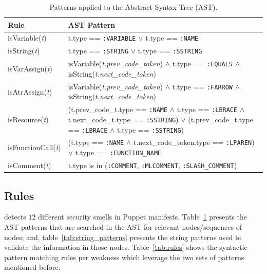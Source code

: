 \begin{table}
      \begin{subtable}[h]{\linewidth}
      \centering
      \begin{tabular}{p{2cm}p{6cm}} 
        \toprule
        \textbf{Rule} & \textbf{AST Pattern}  \\
        \midrule		
        isVariable(\textit{t}) & 
          t.type == \texttt{:VARIABLE} $\vee$ t.type == \texttt{:NAME} \\\midrule
        isString(\textit{t}) & 
          t.type == \texttt{:STRING} $\vee$ t.type == \texttt{:SSTRING} \\\midrule
        isVarAssign(\textit{t}) & 
          isVariable(\textit{t.prev\_code\_token}) $\wedge$ 
          t.type == \texttt{:EQUALS} $\wedge$ 
          isString(\textit{t.next\_code\_token}) \\\midrule
        isAtrAssign(\textit{t}) & 
          isVariable(\textit{t.prev\_code\_token}) $\wedge$ 
          t.type == \texttt{:FARROW} $\wedge$ 
          isString(\textit{t.next\_code\_token}) \\\midrule
        isResource(\textit{t}) &
          (t.prev\_code\_t.type == \texttt{:NAME} $\wedge$ 
          t.type == \texttt{:LBRACE} $\wedge$ 
          t.next\_code\_t.type == \texttt{:SSTRING}) $\vee$
          (t.prev\_code\_t.type == \texttt{:LBRACE} $\wedge$ 
          t.type == \texttt{:SSTRING})\\\midrule
        isFunctionCall(\textit{t}) &
          (t.type == \texttt{:NAME} $\wedge$ 
          t.next\_code\_token.type == \texttt{:LPAREN}) $\vee$
          t.type == \texttt{:FUNCTION\_NAME} \\\midrule
        isComment(\textit{t}) & 
          t.type is in (\texttt{:COMMENT}, \texttt{:MLCOMMENT}, \texttt{:SLASH\_COMMENT})\\
      \bottomrule
      \end{tabular}
      \caption{Patterns applied to the Abstract Syntax Tree (AST).}
      \label{tab:ast_patterns}
      \end{subtable}
      \vspace{-4ex}
\end{table}
%
%
\subsection{Rules}\label{sec:rules}
%
\toolname{} detects $12$ different security smells in Puppet manifests.
Table~\ref{tab:ast_patterns} presents the AST patterns 
that are searched in the AST for relevant nodes/sequences of nodes; 
and, table~\ref{tab:string_patterns} presents the string patterns used 
to validate the information in those nodes.
Table~\ref{tab:rules} shows the syntactic pattern matching rules per 
weakness which leverage the two sets of patterns mentioned
before.


